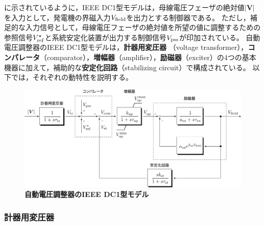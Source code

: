 \documentclass[tombow,dvipdfmx]{corona-a5-1.1}
\begin{document}
に示されているように，IEEE DC1型モデルは，母線電圧フェーザの絶対値$|\bm{V}|$を入力として，発電機の界磁入力$V_{\rm field}$を出力とする制御器である。
ただし，補足的な入力信号として，母線電圧フェーザの絶対値を所望の値に調整するための参照信号$V_{\rm ref}^{\star}$と系統安定化装置が出力する制御信号$V_{\rm pss}$が印加されている。
自動電圧調整器のIEEE DC1型モデルは，\textbf{計器用変圧器} （voltage transformer），\textbf{コンパレータ}（comparator），\textbf{増幅器}（amplifier），\textbf{励磁器}（exciter）の4つの基本機器に加えて，補助的な\textbf{安定化回路}（stabilizing circuit）で構成されている。
以下では，それぞれの動特性を説明する。


\begin{figure}[t]
\centering
\includegraphics[width = 0.99\linewidth]{figs/avrdc1}
\medskip
\caption{\textbf{自動電圧調整器のIEEE DC1型モデル}}
\label{fig:avrdc1}
\medskip
\end{figure}


\smallskip
\subsubsection{計器用変圧器}
\end{document}
